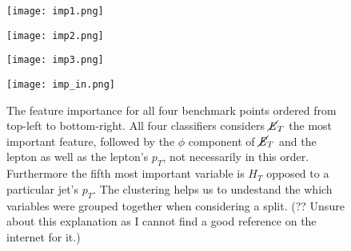 \begin{figure}[htbp]
\centering
  \begin{minipage}[htbp]{0.45\textwidth}
    \centering
    \texttt{[image: imp1.png]}
    \label{fig:imp1}
  \end{minipage}
  \hfill
  \begin{minipage}[htbp]{0.45\textwidth}
    \centering
    \texttt{[image: imp2.png]}
    \label{fig:imp2}
  \end{minipage}
  \hfill
  \begin{minipage}[htbp]{0.45\textwidth}
    \centering
    \texttt{[image: imp3.png]}
    \label{fig:imp3}
  \end{minipage}
  \hfill
  \begin{minipage}[htbp]{0.45\textwidth}
    \centering
    \texttt{[image: imp\_in.png]}
    \label{fig:imp_n}
  \end{minipage}
  \caption{The feature importance for all four benchmark points ordered from top-left to bottom-right. All four classifiers considers $\cancel{\it{E}}_{T}$ the most important feature, followed by the $\phi$ component of $\cancel{\it{E}}_{T}$ and the lepton as well as the lepton's $p_T$, not necessarily in this order. Furthermore the fifth most important variable is $H_T$ opposed to a particular jet's $p_T$. The clustering helps us to undestand the which variables were grouped together when considering a split. (??  Unsure about this explanation as I cannot find a good reference on the internet for it.)}
  \label{fig:imps}
\end{figure}

